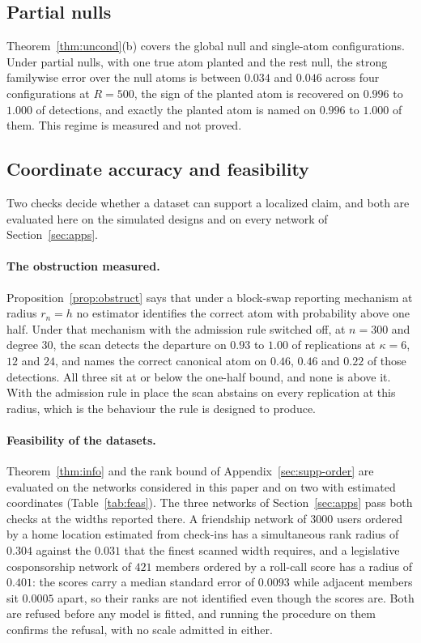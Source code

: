 \documentclass[11pt]{article}
\theoremstyle{definition}
\newcommand{\1}{\mathbf 1}\newcommand{\op}{\operatorname}
\begin{document}
\subsection{Partial nulls}                                  \label{sec:partial}

Theorem~\ref{thm:uncond}(b) covers the global null and single-atom
configurations.  Under partial nulls, with one true atom planted and the rest
null, the strong familywise error over the null atoms is between $0.034$ and
$0.046$ across four configurations at $R=500$, the sign of the planted atom is
recovered on $0.996$ to $1.000$ of detections, and exactly the planted atom is
named on $0.996$ to $1.000$ of them.  This regime is measured and not proved.

\subsection{Coordinate accuracy and feasibility}      \label{sec:scope}

Two checks decide whether a dataset can support a localized claim, and both
are evaluated here on the simulated designs and on every network of
Section~\ref{sec:apps}.

\paragraph{The obstruction measured.}
Proposition~\ref{prop:obstruct} says that under a block-swap reporting
mechanism at radius $r_n=h$ no estimator identifies the correct atom with
probability above one half.  Under that mechanism with the admission rule
switched off, at $n=300$ and degree $30$, the scan detects the departure on
$0.93$ to $1.00$ of replications at $\kappa=6$, $12$ and $24$, and names the
correct canonical atom on $0.46$, $0.46$ and $0.22$ of those detections.  All
three sit at or below the one-half bound, and none is above it.  With the
admission rule in place the scan abstains on every replication at this radius,
which is the behaviour the rule is designed to produce.

\paragraph{Feasibility of the datasets.}
Theorem~\ref{thm:info} and the rank bound of Appendix~\ref{sec:supp-order} are
evaluated on the networks considered in this paper and on two with estimated
coordinates (Table~\ref{tab:feas}).  The three networks of
Section~\ref{sec:apps} pass both checks at the widths reported there.  A
friendship network of $3000$ users ordered by a home location estimated from
check-ins has a simultaneous rank radius of $0.304$ against the $0.031$ that
the finest scanned width requires, and a legislative cosponsorship network of
$421$ members ordered by a roll-call score has a radius of $0.401$: the scores
carry a median standard error of $0.0093$ while adjacent members sit $0.0005$
apart, so their ranks are not identified even though the scores are.  Both are
refused before any model is fitted, and running the procedure on them confirms
the refusal, with no scale admitted in either.
\end{document}
